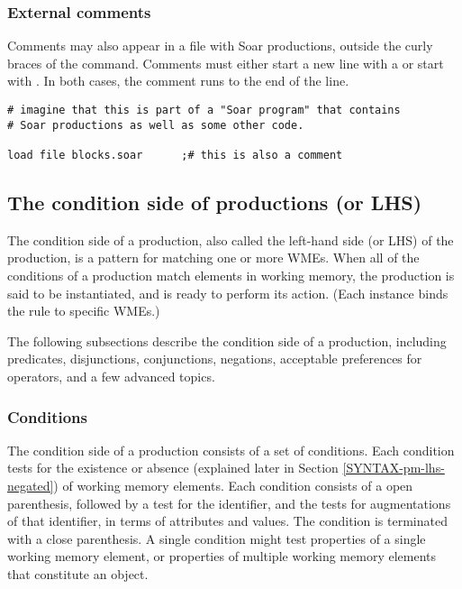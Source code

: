 \subsubsection*{External comments}

Comments may also appear in a file with Soar productions, outside  the curly braces of the  command.  Comments must either start a new line with a \soar{\#} or start with \soar{;\#}. In both cases, the comment runs to the end of the line.

\begin{verbatim}
# imagine that this is part of a "Soar program" that contains 
# Soar productions as well as some other code.

load file blocks.soar      ;# this is also a comment
\end{verbatim}


\subsection{The condition side of productions (or LHS)}
\label{SYNTAX-pm-lhs}

The condition side of a production, also called the left-hand side (or LHS) of the production, is a pattern for matching one or more WMEs. When all of the conditions of a production match elements in working memory, the production is said to be instantiated, and is ready to perform its action. (Each instance binds the rule to specific WMEs.)

The following subsections describe the condition side of a production, including predicates, disjunctions, conjunctions, negations, acceptable preferences for operators, and a few advanced topics. 

\subsubsection{Conditions}
\label{SYNTAX-pm-lhs-conditions}

The condition side of a production consists of a set of conditions. Each condition tests for the existence or absence (explained later in Section \ref{SYNTAX-pm-lhs-negated}) of working memory elements. Each condition consists of a open parenthesis, followed by a test for the identifier, and the tests for augmentations of that identifier, in terms of attributes and values.  The condition is terminated with a close parenthesis. A single condition might test properties of a single working memory element, or properties of multiple working memory elements that constitute an object.


